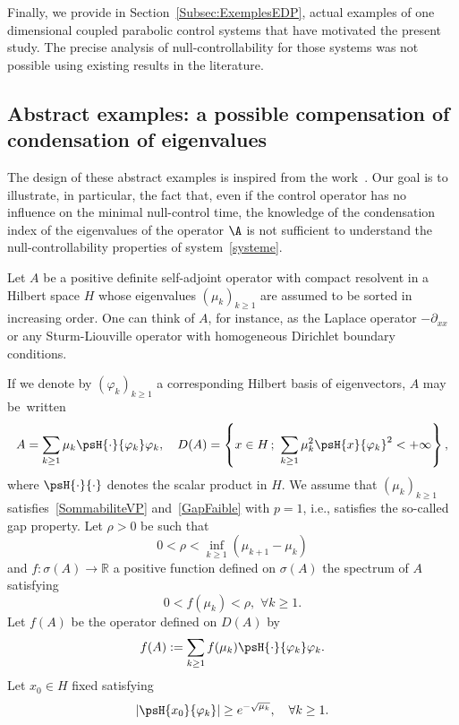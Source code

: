 Finally, we provide in Section~\ref{Subsec:ExemplesEDP}, actual examples of one dimensional coupled parabolic control systems that have motivated the present study. The precise analysis of null-controllability for those systems was not possible using existing results in the literature.


\subsection{Abstract examples: a possible compensation of condensation of eigenvalues} \label{Subsec:ExemplesAcademiques}

The design of these abstract examples is inspired from the work~\cite{AKBDK05}. Our goal is to illustrate, in particular, the fact that, even if the control operator has no influence on the minimal null-control time, the knowledge of the condensation index of the eigenvalues of the operator $\A$ is not sufficient to understand the null-controllability properties of system~\eqref{systeme}.

Let $A$ be a positive definite self-adjoint operator with compact resolvent in a Hilbert space $H$ whose eigenvalues $(\mu _{k})_{k \geq 1}$ are assumed to be sorted in increasing order. One can think of $A$, for instance, as the Laplace operator $-\partial_{xx} $ or any Sturm-Liouville operator with homogeneous Dirichlet boundary conditions.

If we denote by $(\varphi _{k})_{k \geq 1}$ a corresponding Hilbert basis of eigenvectors, $A$ may be~written
\begin{equation*}
A=\sum_{k \geq 1} \mu_{k} \psH{\cdot}{\varphi_{k}} \varphi_{k}, \quad D(A)=\left\{x\in H \,;\,\, \sum_{k\geq 1}\mu_k^2 \psH{x}{\varphi_k}^2<+\infty\right\},
\end{equation*}
where $\psH{\cdot}{\cdot}$ denotes the scalar product in $H$. We assume that $(\mu_k)_{k \geq 1}$ satisfies~\eqref{SommabiliteVP} and~\eqref{GapFaible} with $p=1$, i.e., satisfies the so-called gap property. Let $\rho >0$ be such that
\begin{equation}\label{hyporho}
0 < \rho < \inf_{k \geq 1} (\mu_{k+1}- \mu_k)
\end{equation}
and $f:\sigma(A)\rightarrow \mathbb{R}$ a positive function defined on $\sigma(A)$ the spectrum of $A$ satisfying
\begin{equation}\label{hypof}
0<f(\mu_k)<\rho, \,\,\forall k\geq 1.
\end{equation}
Let $f(A)$ be the operator defined on $D(A)$ by
\begin{equation*}
f(A):=\sum_{k\geq 1}f(\mu _{k}) \psH{\cdot}{\varphi _{k} } \varphi _{k}.
\end{equation*}
Let $x_0\in H$ fixed satisfying
\begin{equation}\label{hypox0}
| \psH{x_0}{\varphi_k}| \geq e^{-\sqrt{\mu_k}},\quad \forall k\geq 1.
\end{equation}


